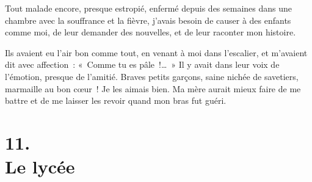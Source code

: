 \documentclass[french,twoside]{book} %
\begin{document}
Tout malade encore, presque estropié, enfermé depuis des semaines dans une chambre avec la souffrance et la fièvre, j’avais besoin de causer à des enfants comme moi, de leur demander des nouvelles, et de leur raconter mon histoire.\par
Ils avaient eu l’air bon comme tout, en venant à moi dans l’escalier, et m’avaient dit avec affection : « Comme tu es pâle !… » Il y avait dans leur voix de l’émotion, presque de l’amitié. Braves petits garçons, saine nichée de savetiers, marmaille au bon cœur ! Je les aimais bien. Ma mère aurait mieux faire de me battre et de me laisser les revoir quand mon bras fut guéri.
\section[{11. Le lycée}]{11. \\
Le lycée}\renewcommand{\leftmark}{11. \\
Le lycée}
\end{document}
